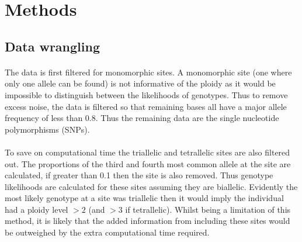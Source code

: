 \documentclass[11pt]{article}
\begin{document}

\section{Methods}
\subsection{Data wrangling}
\paragraph{}The data is first filtered for monomorphic sites. A monomorphic site (one where only one allele can be found) is not informative of the ploidy as it would be impossible to distinguish between the likelihoods of genotypes. Thus to remove excess noise, the data is filtered so that remaining bases all have a major allele frequency of less than 0.8. Thus the remaining data are the single nucleotide polymorphisms (SNPs). 
\paragraph{}To save on computational time the triallelic and tetrallelic sites are also filtered out. The proportions of the third and fourth most common allele at the site are calculated, if greater than 0.1 then the site is also removed. Thus genotype likelihoods are calculated for these sites assuming they are biallelic. Evidently the most likely genotype at a site was triallelic then it would imply the individual had a ploidy level $>2$ (and $>3$ if tetrallelic). Whilst being a limitation of this method, it is likely that the added information from including these sites would be outweighed by the extra computational time required.
\end{document}
